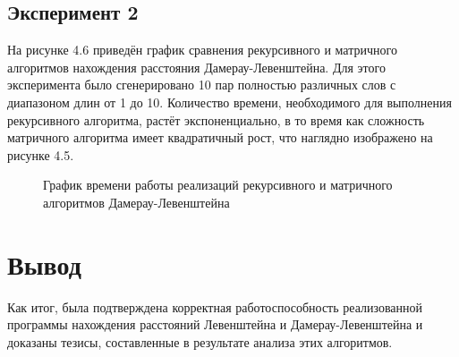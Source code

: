 \subsection{Эксперимент 2}
На рисунке 4.6 приведён график сравнения рекурсивного и матричного алгоритмов нахождения расстояния Дамерау-Левенштейна. Для этого эксперимента было сгенерировано 10 пар полностью различных слов с диапазоном длин от 1 до 10. Количество времени, необходимого для выполнения рекурсивного алгоритма, растёт экспоненциально, в то время как сложность матричного алгоритма имеет квадратичный рост, что наглядно изображено на рисунке 4.5.
\begin{figure}[H]
    \centering
    \caption{График времени работы реализаций рекурсивного и матричного алгоритмов Дамерау-Левенштейна}
\end{figure}

\pagebreak

\section{Вывод}

Как итог, была подтверждена корректная работоспособность реализованной программы нахождения расстояний Левенштейна и Дамерау-Левенштейна и доказаны тезисы, составленные в результате анализа этих алгоритмов.

